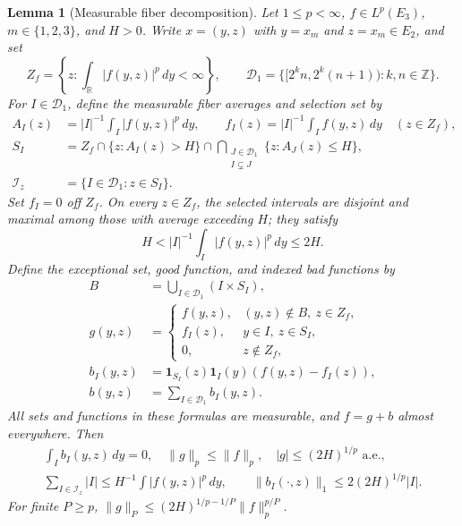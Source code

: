 \documentclass[12pt,reqno]{amsart}
\theoremstyle{plain}
\newtheorem{lemma}[theorem]{Lemma}
\theoremstyle{definition}
\theoremstyle{remark}
\numberwithin{equation}{section}
\newcommand{\R}{\mathbb R}
\newcommand{\Z}{\mathbb Z}
\newcommand{\dd}{\,d}
\newcommand{\one}{\mathbf 1}
\begin{document}
\begin{lemma}[Measurable fiber decomposition]\label{lem:fiber_cz}
Let $1\le p<\infty$, $f\in L^p(E_3)$, $m\in\{1,2,3\}$, and $H>0$.
Write $x=(y,z)$ with $y=x_m$
and $z=x_{\widehat m}\in E_2$, and set
\[
 Z_f=\left\{z:\int_\R|f(y,z)|^p\dd y<\infty\right\},\qquad
 \mathcal D_1=\{[2^k n,2^k(n+1)):k,n\in\Z\}.
\]
For $I\in\mathcal D_1$, define the measurable fiber averages and
selection set by
\begin{align*}
 A_I(z)&=|I|^{-1}\int_I|f(y,z)|^p\dd y,\qquad
 f_I(z)=|I|^{-1}\int_I f(y,z)\dd y\quad(z\in Z_f),\\
 S_I&=Z_f\cap\{z:A_I(z)>H\}
       \cap\bigcap_{\substack{J\in\mathcal D_1\\I\subsetneq J}}
                                           \{z:A_J(z)\le H\},\\
 \mathcal I_z&=\{I\in\mathcal D_1:z\in S_I\}.
\end{align*}
Set $f_I=0$ off $Z_f$. On every $z\in Z_f$, the selected intervals
are disjoint and maximal among those with average exceeding $H$;
they satisfy
\[
 H<|I|^{-1}\int_I|f(y,z)|^p\dd y\le2H.
\]
Define the exceptional set, good function, and indexed bad functions by
\begin{align*}
 B&=\bigcup_{I\in\mathcal D_1}(I\times S_I),\\
 g(y,z)&=\begin{cases}
 f(y,z),&(y,z)\notin B,\ z\in Z_f,\\
 f_I(z),&y\in I,\ z\in S_I,\\
 0,&z\notin Z_f,
 \end{cases}\\
 b_I(y,z)&=\one_{S_I}(z)\one_I(y)(f(y,z)-f_I(z)),\\
 b(y,z)&=\sum_{I\in\mathcal D_1}b_I(y,z).
\end{align*}
All sets and functions in these formulas are measurable, and
$f=g+b$ almost everywhere. Then
\begin{gather*}
 \int_Ib_I(y,z)\dd y=0,\quad
 \|g\|_p\le\|f\|_p,\quad |g|\le(2H)^{1/p}\text{ a.e.},\\
 \sum_{I\in\mathcal I_z}|I|\le H^{-1}\int|f(y,z)|^p\dd y,
 \qquad \|b_I(\cdot,z)\|_1\le2(2H)^{1/p}|I|.
\end{gather*}
For finite $P\ge p$, $\|g\|_P\le(2H)^{1/p-1/P}\|f\|_p^{p/P}$.
\end{lemma}
\end{document}
